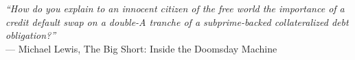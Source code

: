 \documentclass[11pt,a4paper,titlepage,french]{article}
\numberwithin{equation}{section}
\theoremstyle{plain}
\theoremstyle{definition}
\theoremstyle{remark}
\begin{document}
\Portada

\clearpage  %
\tableofcontents
\thispagestyle{fancy}  %
\clearpage  %

\listoffigures
\thispagestyle{fancy}  %
\clearpage  %

\listoftables
\thispagestyle{fancy}  %
\clearpage  %

\newpage
{}  %


\cleardoublepage
\thispagestyle{empty}

\vspace*{\fill}
\begin{flushright}
\emph{“How do you explain to an innocent citizen of the free world the importance of a credit default swap
 on a double-A tranche of a subprime-backed collateralized debt obligation?”}\\
— Michael Lewis, The Big Short: Inside the Doomsday Machine
\end{flushright}
\vspace*{\fill}

\cleardoublepage

















\newpage

\end{document}
